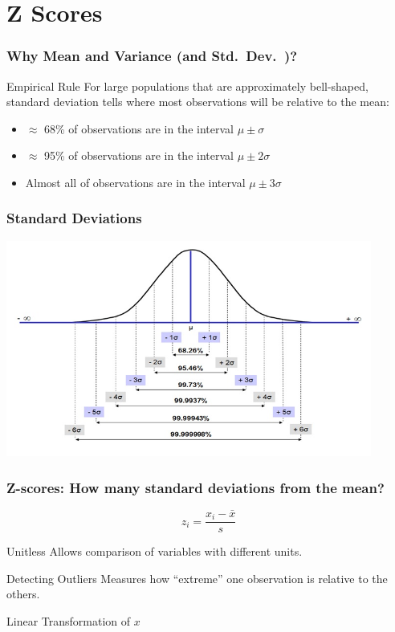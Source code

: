 \documentclass{beamer}
\begin{document}
\section{Z Scores}
\begin{frame}
\frametitle{Why Mean and Variance (and Std.\ Dev.\ )?}
	\begin{alertblock}{Empirical Rule}
	For large populations that are approximately bell-shaped, standard deviation tells where most 		observations will be relative to the mean:
		\begin{itemize}
			\item $\approx$ 68\% of observations are in the interval $\mu \pm \sigma$
			\item $\approx$ 95\% of observations are in the interval $\mu \pm 2\sigma$
			\item Almost all of observations are in the interval $\mu \pm 3\sigma$
		\end{itemize}
	\end{alertblock}
\end{frame}

\begin{frame}
\frametitle{Standard Deviations}
	\centering
	\includegraphics[width = 0.9\textwidth]{./images/six_sigma_normal_distribution.jpg}
	
\end{frame}

\begin{frame}
\frametitle{Z-scores: How many standard deviations from the mean?}
	$$
	z _i= \frac{x_i - \bar{x}}{s}
	$$
	\pause
	\begin{block}{Unitless}
		Allows comparison of variables with different units.
	\end{block}
	\pause
	\begin{block}{Detecting Outliers}
		Measures how ``extreme'' one observation is relative to the others.
	\end{block}
	\pause
	\begin{block}{Linear Transformation of $x$}
	\end{block}
\end{frame}
\end{document}
